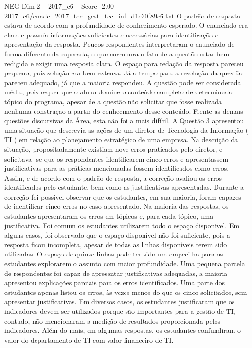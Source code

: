 \begin{textsample}{NEG Dim 2 – 2017\_c6 – Score -2.00 – 2017\_c6/enade\_2017\_tec\_gest\_tec\_inf\_d1e30f89c6.txt}
O padrão de resposta estava de acordo com a profundidade de conhecimento esperado.
O enunciado era claro e possuía informações suficientes e necessárias para identificação e apresentação da resposta.
Poucos respondentes interpretaram o enunciado de forma diferente da esperada, o que corrobora o fato de a questão estar bem redigida e exigir uma resposta clara.
O espaço para redação da resposta pareceu pequeno, pois solução era bem extensa.
Já o tempo para a resolução da questão pareceu adequado, já que a maioria respondeu.
A questão pode ser considerada média, pois requer que o aluno domine o conteúdo completo de determinado tópico do programa, apesar de a questão não solicitar que fosse realizada nenhuma construção a partir do conhecimento desse conteúdo.
Frente as demais questões discursivas da Área, esta não foi a mais difícil.
A Questão 3 apresentou uma situação que descrevia as ações de um diretor de Tecnologia da Informação ( TI ) em relação ao planejamento estratégico de uma empresa.
Na descrição da situação, propositadamente existiam nove erros praticados pelo diretor, e solicitava -se que os respondentes identificarem cinco erros e apresentassem justificativas para as práticas mencionadas fossem identificados como erros.
Assim, e de acordo com o padrão de resposta, a correção avaliou os erros identificados pelo estudante, bem como as justificativas apresentadas.
Durante a correção foi possível observar que os estudantes, em sua maioria, foram capazes de identificar cinco erros no caso apresentado.
Na maioria das respostas, os estudantes apresentaram os erros em tópicos e, para cada tópico, uma justificativa.
Foi comum os estudantes utilizarem todo o espaço disponível.
Em alguns casos, foi observado que o espaço disponível não foi suficiente, pois a resposta ficou incompleta, apesar de todas as linhas disponíveis terem sido utilizadas.
O espaço de quinze linhas pode ter sido um empecilho para os estudantes explorarem o assunto com maior profundidade.
Uma pequena parcela de respondentes foi capaz de apresentar justificativas adequadas, a maioria apresentou explicações parciais para os erros identificados.
Uma parte dos estudantes apenas listou os erros, às vezes menos do que os cinco solicitados, sem apresentar justificativas.
Em diversos casos, os estudantes justificaram que os indicadores devem ser utilizados porque são importantes para a gestão de TI, contudo, não mencionaram a medição de resultados proporcionada pelos indicadores.
Além do mais, em algumas respostas, os estudantes confundiram o valor do departamento de TI com valor financeiro de TI.

\end{textsample}
